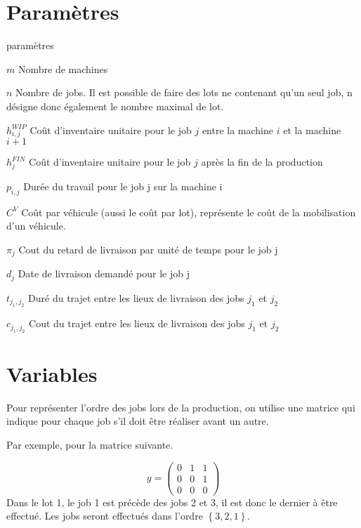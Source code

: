 \section*{Paramètres}
\begin{labeling}{paramètres}

	\item [$m$]
	Nombre de machines
	\item [$n$]
	Nombre de jobs.
	Il est possible de faire des lots ne contenant qu’un seul job,
	n désigne donc également le nombre maximal de lot.
	\item [$h_{i,j}^{WIP}$]
	Coût d’inventaire unitaire pour le job $j$ entre la machine $i$ et la machine $i+1$
	\item [$h_j^{FIN}$]
	Coût d’inventaire unitaire pour le job $j$ après la fin de la production
	\item [$p_{i,j}$]
	Durée du travail pour le job j sur la machine i
	\item [$C^V$]
	Coût par véhicule (aussi le coût par lot), représente le coût de la mobilisation d’un véhicule.
	\item [$\pi_j$]
	Cout du retard de livraison par unité de temps pour le job j
	\item [$d_j$]
	Date de livraison demandé pour le job j
	\item [$t_{j_1,j_2}$]
	Duré du trajet entre les lieux de livraison des jobs $j_1$ et $j_2$
	\item [$c_{j_1,j_2}$]
	Cout du trajet entre les lieux de livraison des jobs $j_1$ et $j_2$
\end{labeling}


\section*{Variables}

Pour représenter l’ordre des jobs lors de la production, on utilise une matrice qui indique pour chaque job s’il doit être réaliser avant un autre.

Par exemple, pour la matrice suivante.

$$
	y=
	\begin{pmatrix}
		0 & 1 & 1 \\
		0 & 0 & 1 \\
		0 & 0 & 0
	\end{pmatrix}
$$
Dans le lot 1, le job 1 est précède des jobs 2 et 3, il est donc le dernier à être effectué. Les jobs seront effectués dans l’ordre $\left\{3,2,1\right\}$.


